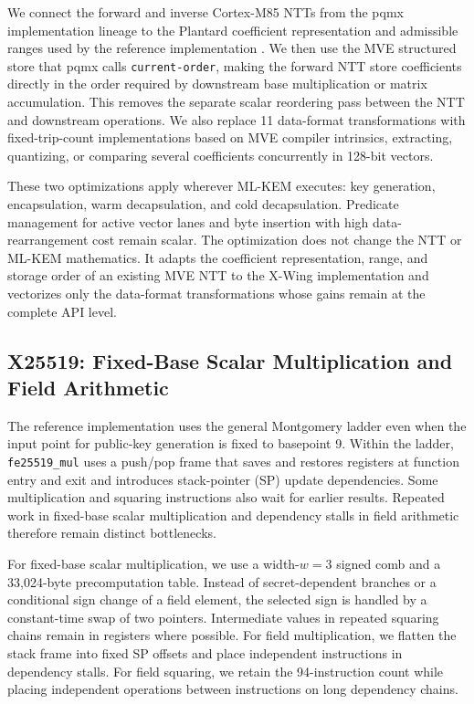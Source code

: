 \documentclass[runningheads,orivec]{llncs}
\newcommand{\xwing}{X-Wing}
\begin{document}
We connect the forward and inverse Cortex-M85 NTTs from the pqmx implementation
lineage to the Plantard coefficient representation and admissible ranges used
by the reference implementation \cite{pqmx}. We then use the MVE structured
store that pqmx calls \texttt{current-order}, making the forward NTT store
coefficients directly in the order required by downstream base multiplication
or matrix accumulation. This removes the separate scalar reordering pass
between the NTT and downstream operations. We also replace 11 data-format
transformations with fixed-trip-count implementations based on MVE compiler
intrinsics, extracting, quantizing, or comparing several coefficients
concurrently in 128-bit vectors.

These two optimizations apply wherever ML-KEM executes: key generation,
encapsulation, warm decapsulation, and cold decapsulation. Predicate management
for active vector lanes and byte insertion with high data-rearrangement cost
remain scalar. The optimization does not change the NTT or ML-KEM mathematics.
It adapts the coefficient representation, range, and storage order of an
existing MVE NTT to the \xwing{} implementation and vectorizes only the
data-format transformations whose gains remain at the complete API level.

\subsection{X25519: Fixed-Base Scalar Multiplication and Field Arithmetic}

The reference implementation uses the general Montgomery ladder even when the
input point for public-key generation is fixed to basepoint 9. Within the
ladder, \texttt{fe25519\_mul} uses a push/pop frame that saves and restores
registers at function entry and exit and introduces stack-pointer (SP) update
dependencies. Some multiplication and squaring instructions also wait for
earlier results. Repeated work in fixed-base scalar multiplication and
dependency stalls in field arithmetic therefore remain distinct bottlenecks.

For fixed-base scalar multiplication, we use a width-$w=3$ signed comb and a
33,024-byte precomputation table. Instead of secret-dependent branches or a
conditional sign change of a field element, the selected sign is handled by a
constant-time swap of two pointers. Intermediate values in repeated squaring
chains remain in registers where possible. For field multiplication, we flatten
the stack frame into fixed SP offsets and place independent instructions in
dependency stalls. For field squaring, we retain the 94-instruction count while
placing independent operations between instructions on long dependency chains.
\end{document}
